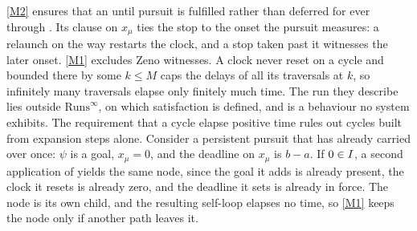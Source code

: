 \ref{M2} ensures that an until pursuit is fulfilled rather
than deferred for ever through . Its clause on $x_\mu$ ties the stop to the onset
the pursuit measures: a relaunch on the way restarts the clock, and a stop taken past it
witnesses the later onset.
\ref{M1} excludes Zeno witnesses. A clock never reset on a cycle and bounded there by some $k\le M$
caps the delays of all its traversals at $k$, so infinitely many traversals elapse only finitely much
time. The run they describe lies outside $\mathrm{Runs}^\infty$, on which satisfaction is defined,
and is a behaviour no system exhibits. The requirement that a cycle elapse positive time rules out
cycles built from expansion steps alone. Consider a persistent pursuit that has already carried over once: $\psi$ is a goal,
$x_\mu=0$, and the deadline on $x_\mu$ is $b-a$. If $0\in I$, a second application of
 yields the same node, since the goal it adds is already present, the clock
it resets is already zero, and the deadline it sets is already in force. The node is its own
child, and the resulting self-loop elapses no time, so \ref{M1} keeps the node only if another
path leaves it.




%

%
%
%